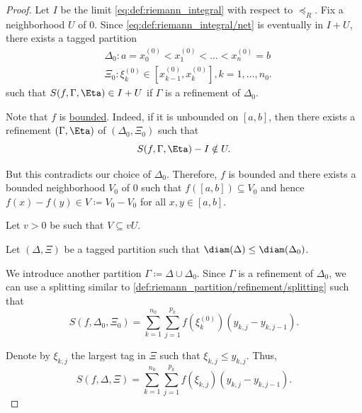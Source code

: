 \begin{proof}
   Let \( I \) be the limit \eqref{eq:def:riemann_integral} with respect to \( \preceq_R \). Fix a neighborhood \( U \) of \( 0 \). Since \eqref{eq:def:riemann_integral/net} is eventually in \( I + U \), there exists a tagged partition
  \begin{equation}\label{eq:def:riemann_integral/tagged_zero}
    \begin{aligned}
      &\Delta_0: a = x_0^{(0)} < x_1^{(0)} < \ldots < x_n^{(0)} = b \\
      &\Xi_0: \xi_k^{(0)} \in [x_{k-1}^{(0)}, x_k^{(0)}], k = 1, \ldots, n_0.
    \end{aligned}
  \end{equation}
  such that \( S(f, \Gamma, \Eta) \in I + U \) if \( \Gamma \) is a refinement of \( \Delta_0 \).

  Note that \( f \) is \hyperref[def:bounded_function/bounded]{bounded}. Indeed, if it is unbounded on \( [a, b] \), then there exists a refinement \( (\Gamma, \Eta) \) of \( (\Delta_0, \Xi_0) \) such that
  \begin{equation*}
    S(f, \Gamma, \Eta) - I \notin U.
  \end{equation*}

  But this contradicts our choice of \( \Delta_0 \). Therefore, \( f \) is bounded and there exists a bounded neighborhood \( V_0 \) of \( 0 \) such that \( f([a, b]) \subseteq V_0 \) and hence \( f(x) - f(y) \in V \coloneqq V_0 - V_0 \) for all \( x, y \in [a, b] \).

  Let  \( v > 0 \) be such that \( V \subseteq vU \).

  Let \( (\Delta, \Xi) \) be a tagged partition such that \( \diam(\Delta) \leq \diam(\Delta_0) \).

  We introduce another partition \( \Gamma \coloneqq \Delta \cup \Delta_0 \). Since \( \Gamma \) is a refinement of \( \Delta_0 \), we can use a splitting similar to \eqref{def:riemann_partition/refinement/splitting} such that
  \begin{equation}\label{def:riemann_partition/subdiameter_splitting}
    S(f, \Delta_0, \Xi_0) = \sum_{k=1}^{n_0} \sum_{j=1}^{p_k} f(\xi^{(0)}_k) (y_{k,j} - y_{k,j-1}).
  \end{equation}

  Denote by \( \xi_{k,j} \) the largest tag in \( \Xi \) such that \( \xi_{k,j} \leq y_{k,j} \). Thus,
  \begin{equation*}
    S(f, \Delta, \Xi) = \sum_{k=1}^{n_0} \sum_{j=1}^{p_k} f(\xi_{k,j}) (y_{k,j} - y_{k,j-1}).
  \end{equation*}


\end{proof}
